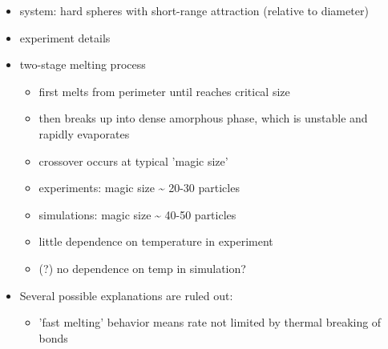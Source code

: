 \documentclass{umthesis}          %
\begin{document}
\begin{itemize}

\item system: hard spheres with short-range attraction (relative to diameter)\\
\label{sec-3.1.2.1}


\item experiment details\\
\label{sec-3.1.2.2}


\item two-stage melting process\\
\label{sec-3.1.2.3}

\begin{itemize}

\item first melts from perimeter until reaches critical size\\
\label{sec-3.1.2.3.1}


\item then breaks up into dense amorphous phase, which is unstable and rapidly evaporates\\
\label{sec-3.1.2.3.2}


\item crossover occurs at typical 'magic size'\\
\label{sec-3.1.2.3.3}


\item experiments: magic size \~{} 20-30 particles\\
\label{sec-3.1.2.3.4}


\item simulations: magic size \~{} 40-50 particles\\
\label{sec-3.1.2.3.5}


\item little dependence on temperature in experiment\\
\label{sec-3.1.2.3.6}


\item (?) no dependence on temp in simulation?\\
\label{sec-3.1.2.3.7}

\end{itemize} %

\item Several possible explanations are ruled out:\\
\label{sec-3.1.2.4}

\begin{itemize}

\item 'fast melting' behavior means rate not limited by thermal breaking of bonds\\
\label{sec-3.1.2.4.1}


\end{itemize}
\end{itemize}
\end{document}
